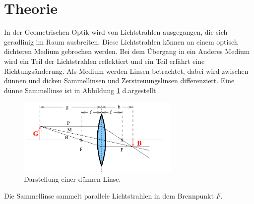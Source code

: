 \section{Theorie}
\label{sec:Theorie}
In der Geometrischen Optik wird von Lichtstrahlen ausgegangen, die sich geradlinig im Raum ausbreiten.
Diese Lichtstrahlen können an einem optisch dichteren Medium gebrochen werden.
Bei dem Übergang in ein Anderes Medium wird ein Teil der Lichtstrahlen reflektiert und ein Teil erfährt eine
Richtungsänderung.
Als Medium werden Linsen betrachtet, dabei wird zwischen dünnen und dicken Sammellinsen und Zerstreuungslinsen
differenziert.
Eine dünne Sammellinse ist in Abbildung \ref{fig:dünn} d.argestellt
\begin{figure}
 \centering
 \includegraphics[width=0.7\textwidth]{dünn.png}
 \caption{Darstellung einer dünnen Linse.\cite{sample}}
 \label{fig:dünn}
 \end{figure}
 Die Sammellinse sammelt parallele Lichtstrahlen in dem Brennpunkt $F$.
